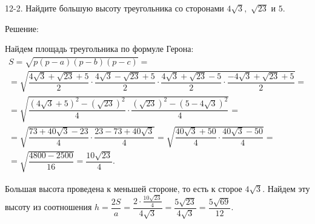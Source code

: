 12-2. Найдите большую высоту треугольника со сторонами $4\sqrt{3},$ $\sqrt{23}$ и $5$.

Решение:

Найдем площадь треугольника по формуле Герона:
\begin{multline*}
S = \sqrt{p(p-a)(p-b)(p-c)} =\\
=\sqrt{\dfrac{4\sqrt{3}+\sqrt{23}+5}{2}\cdot \dfrac{4\sqrt{3}-\sqrt{23}+5}{2}\cdot \dfrac{4\sqrt{3}+\sqrt{23}-5}{2}\cdot \dfrac{-4\sqrt{3}+\sqrt{23}+5}{2}}=\\
=\sqrt{\dfrac{(4\sqrt{3}+5)^2-(\sqrt{23})^2}{4}\cdot \dfrac{(\sqrt{23})^2-(5-4\sqrt{3})^2}{4}}=\\
=\sqrt{\dfrac{73+40\sqrt{3}-23}{4}\cdot \dfrac{23-73+40\sqrt{3}}{4}} =\sqrt{\dfrac{40\sqrt{3}+50}{4}\cdot \dfrac{40\sqrt{3}-50}{4}} =\\= \sqrt{\dfrac{4800-2500}{16}} = \dfrac{10\sqrt{23}}{4}.
\end{multline*}

Большая высота проведена к меньшей стороне, то есть к сторое $4\sqrt{3}$. Найдем эту высоту из соотношения $h=\dfrac{2S}{a} = \dfrac{2\cdot\frac{10\sqrt{23}}{4}}{4\sqrt{3}} = \dfrac{5\sqrt{23}}{4\sqrt{3}} = \dfrac{5\sqrt{69}}{12}.$



